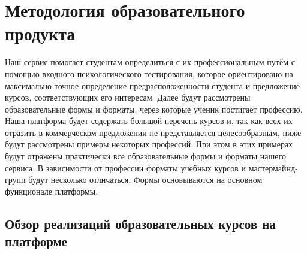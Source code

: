 \documentclass[12pt]{article}
\begin{document}
\section{Методология образовательного продукта}
Наш сервис помогает студентам определиться с их профессиональным путём с помощью входного психологического тестирования, которое ориентировано на максимально точное определение предрасположенности студента и предложение курсов, соответствующих его интересам. Далее будут рассмотрены образовательные формы и форматы, через которые ученик постигает профессию. Наша платформа будет содержать большой перечень курсов и, так как всех их отразить в коммерческом предложении не представляется целесообразным, ниже будут рассмотрены примеры некоторых профессий. При этом в этих примерах будут отражены практически все образовательные формы и форматы нашего сервиса. В зависимости от профессии форматы учебных курсов и мастермайнд-групп будут несколько отличаться. Формы основываются на основном функционале платформы.

\subsection{Обзор реализаций образовательных курсов на платформе}
\end{document}
